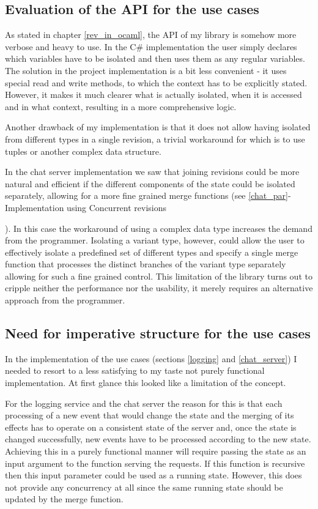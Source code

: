 \documentclass[12pt,twoside,notitlepage]{report}
\begin{document}
{\subsection{Evaluation of the API for the use cases}
\label{eval_api}
As stated in chapter \ref{rev_in_ocaml}, the API of my library is somehow more verbose and heavy to use. In the C\# implementation the user simply declares which variables have to be isolated and then uses them as any regular variables. The solution in the project implementation is a bit less convenient - it uses special read and write methods, to which the context has to be explicitly stated. However, it makes it much clearer what is actually isolated, when it is accessed and in what context, resulting in a more comprehensive logic.  

Another drawback of my implementation is that it does not allow having isolated from different types in a single revision, a trivial workaround for which is to use tuples or another complex data structure. 

In the chat server implementation we saw that joining revisions could be more natural and efficient if the different components of the state could be isolated separately, allowing for a more fine grained merge functions (see \ref{chat_par}-Implementation using Concurrent revisions}). In this case the workaround of using a complex data type increases the demand from the programmer. Isolating a variant type, however, could allow the user to effectively isolate a predefined set of different types and specify a single merge function that processes the distinct branches of the variant type separately allowing for such a fine grained control. This limitation of the library turns out to cripple neither the performance nor the usability, it merely requires an alternative approach from the programmer.  

\subsection{Need for imperative structure for the use cases}
\label{eval_imp}
In the implementation of the use cases (sections \ref{logging} and \ref{chat_server}) I needed to resort to a less satisfying to my taste not purely functional implementation. At first glance this looked like a limitation of the concept.

For the logging service and the chat server the reason for this is that each processing of a new event that would change the state and the merging of its effects has to operate on a consistent state of the server and, once the state is changed successfully, new events have to be processed according to the new state. Achieving this in a purely functional manner will require passing the state as an input argument to the function serving the requests. If this function is recursive then this input parameter could be used as a running state. However, this does not provide any concurrency at all since the same running state should be updated by the merge function.
\end{document}
